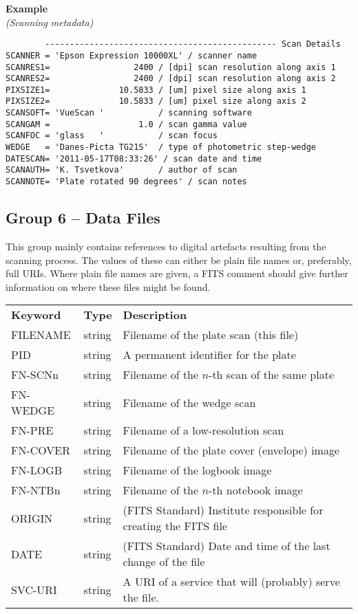 \documentclass[11pt]{ivoa}
\newenvironment{fitsexample}[1]
{\bigskip\noindent\textbf{Example}\\\textit{(#1)\smallskip}}
{\medskip}
\begin{document}
\begin{fitsexample}{Scanning metadata}
\begin{lstlisting}
        ----------------------------------------------- Scan Details
SCANNER = 'Epson Expression 10000XL' / scanner name
SCANRES1=                 2400 / [dpi] scan resolution along axis 1
SCANRES2=                 2400 / [dpi] scan resolution along axis 2
PIXSIZE1=              10.5833 / [um] pixel size along axis 1
PIXSIZE2=              10.5833 / [um] pixel size along axis 2
SCANSOFT= 'VueScan '           / scanning software
SCANGAM =                  1.0 / scan gamma value
SCANFOC = 'glass   '           / scan focus
WEDGE   = 'Danes-Picta TG21S'  / type of photometric step-wedge
DATESCAN= '2011-05-17T08:33:26' / scan date and time
SCANAUTH= 'K. Tsvetkova'       / author of scan
SCANNOTE= 'Plate rotated 90 degrees' / scan notes
\end{lstlisting}
\end{fitsexample}


\subsection{Group 6 – Data Files}

This group mainly contains references to digital artefacts resulting
from the scanning process.  The values of these can either be plain file
names or, preferably, full URIs.  Where plain file names are given, a
FITS comment should give further information on where these files might
be found.

\begin{inlinetable}
\footnotesize
\begin{tabular}{llp{}}
\sptablerule
\textbf{Keyword}&\textbf{Type}&\textbf{Description}\\
\sptablerule
FILENAME &string    &Filename of the plate scan (this file)\\
PID      &string    &A permanent identifier for the plate\\
FN-SCNn  &string    &
  Filename of the $n$-th scan of the same plate\\
FN-WEDGE &string    &Filename of the wedge scan\\
FN-PRE   &string    &
  Filename of a low-resolution scan\\
FN-COVER &string    &
  Filename of the plate cover (envelope) image\\
FN-LOGB  &string    &Filename of the logbook image\\
FN-NTBn  &string    &
  Filename of the $n$-th notebook image\\
ORIGIN   &string    &
  (FITS Standard) Institute responsible for creating the FITS file\\
DATE     &string    &
  (FITS Standard) Date and time of the last change of the file \\
SVC-URI  &string    &
  A URI of a service that will (probably) serve the file.\\
\end{tabular}
\end{inlinetable}
\end{document}
